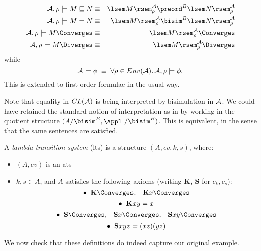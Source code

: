 \begin{eqnarray*}
{\cal A}, \rho \models M \sqsubseteq N & \equiv & \lsem M \rsem^{{\cal A}}_{\rho} \preord^{B} \lsem N \rsem^{{\cal A}}_{\rho} \\
{\cal A}, \rho \models  M = N & \equiv & \lsem M \rsem^{{\cal A}}_{\rho} \bisim^{B} \lsem N \rsem^{{\cal A}}_{\rho} \\
{\cal A}, \rho \models M \Converges & \equiv & \lsem M \rsem^{{\cal A}}_{\rho} \Converges \\
{\cal A}, \rho \models M \Diverges & \equiv & \lsem M \rsem^{{\cal A}}_{\rho} \Diverges 
\end{eqnarray*}
while
\[ {\cal A} \models \phi \; \equiv \; \forall \rho \in Env({\cal A}). \, {\cal A}, \rho \models \phi . \]
This is extended to first-order formulae in the usual way.

Note that equality in $CL({\cal A})$ is being interpreted by bisimulation in ${\cal A}$. 
We could have retained the standard notion of interpretation as in \cite{Bar} by working in the quotient structure $(A/{\bisim^{B}}, \appl\  /{\bisim^{B}})$. 
This is equivalent, in the sense that the same sentences are satisfied.
\begin{definition}
{\rm A {\em lambda transition system} (lts) is a structure $(A, ev, k, s)$, where:
\begin{itemize}
\item $(A, ev)$ is an ats
\item $k, s \in A$, and $A$ satisfies the following axioms 
(writing {\bf K, S} for $c_{k}, c_{s}$):
\[ \bullet \;\; {\bf K} \Converges , \;\;\; {\bf K} x \Converges \]
\[ \bullet \;\; {\bf K} x y = x \]
\[ \bullet \;\; {\bf S} \Converges , \;\;\; {\bf S} x \Converges , \;\;\; {\bf S} x y \Converges \]
\[ \bullet \;\; {\bf S} x y z = (x z)(y z) \]
\end{itemize}}
\end{definition}

We now check that these definitions do indeed capture our original example.
